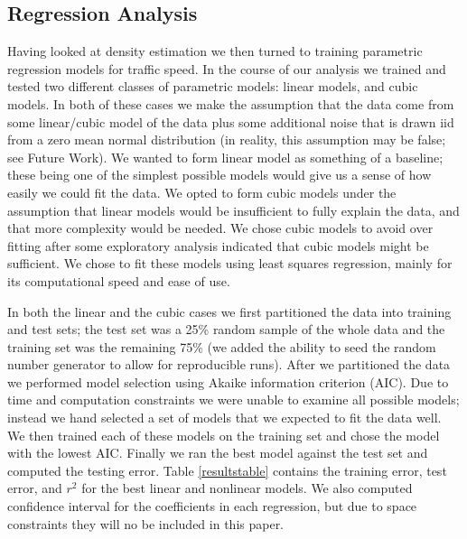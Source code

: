 \documentclass[12pt]{article}
\begin{document}
\subsection{Regression Analysis}
Having looked at density estimation we then turned to training parametric regression models for traffic speed.
In the course of our analysis we trained and tested two different classes of parametric models: linear models, and cubic models. In both of these cases we make the assumption that the data come from some linear/cubic model of the data plus some additional noise that is drawn iid from a zero mean normal distribution (in reality, this assumption may be false; see Future Work). We wanted to form linear model as something of a baseline; these being one of the  simplest possible models would give us a sense of how easily we could fit the data. We opted to form cubic models under the assumption that linear models would be insufficient to fully explain the data, and that more complexity would be needed. We chose cubic models to avoid over fitting after some exploratory analysis indicated that cubic models might be sufficient. We chose to fit these models using least squares regression, mainly for its computational speed and ease of use.

In both the linear and the cubic cases we first partitioned the data into training and test sets; the test set was a 25\% random sample of the whole data and the training set was the remaining 75\% (we added the ability to seed the random number generator to allow for reproducible runs). After we partitioned the data we performed model selection using Akaike information criterion (AIC). Due to time and computation constraints we were unable to examine all possible models; instead we hand selected a set of models that we expected to fit the data well. We then trained each of these models on the training set and chose the model with the lowest AIC. Finally we ran the best model against the test set and computed the testing error. Table \ref{resultstable} contains the training error, test error, and $r^2$ for the best linear and nonlinear models. We also computed confidence interval for the coefficients in each regression, but due to space constraints they will no be included in this paper.
\end{document}
